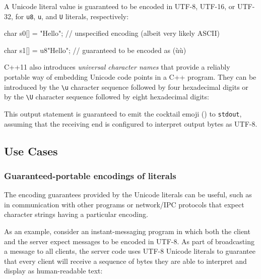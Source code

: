 \noindent A Unicode literal value is guaranteed to be encoded in UTF-8, UTF-16, or
UTF-32, for \lstinline!u8!, \lstinline!u!, and \lstinline!U! literals,
respectively:

\begin{emcppslisting}
char s0[] = "Hello";
    // unspecified encoding (albeit very likely ASCII)

char s1[] = u8"Hello";
    // guaranteed to be encoded as (ù{}ù)
\end{emcppslisting}
    
\noindent C++11 also introduces \emph{universal character names} that provide a
reliably portable way of embedding Unicode code points in a C++ program.
They can be introduced by the \lstinline!\u! character
sequence followed by four hexadecimal digits or by the
\lstinline!\U! character sequence followed by eight
hexadecimal digits:

\newpage%
\begin{emcppslisting}
#include <cstdio>  // (ù{ù)                                               
void f()                                                                        
{                                                                               
    std::puts(u8"\U0001F378"); // Unicode code point in a UTF8-encoded literal  
}
\end{emcppslisting}
    
\noindent This output statement is guaranteed to emit the cocktail emoji
(\martini) to \lstinline!stdout!, assuming that the receiving end is configured to
interpret output bytes as UTF-8.

\subsection[Use Cases]{Use Cases}\label{use-cases}

\subsubsection[Guaranteed-portable encodings of literals]{Guaranteed-portable encodings of literals}\label{guaranteed-portable-encodings-of-literals}

The encoding guarantees provided by the Unicode literals can be useful,
such as in communication with other programs or network/IPC protocols that
expect character strings having a particular encoding.

As an example, consider an instant-messaging program in which both the
client and the server expect messages to be encoded in UTF-8. As part of
broadcasting a message to all clients, the server code uses UTF-8
Unicode literals to guarantee that every client will receive a sequence
of bytes they are able to interpret and display as human-readable text:


